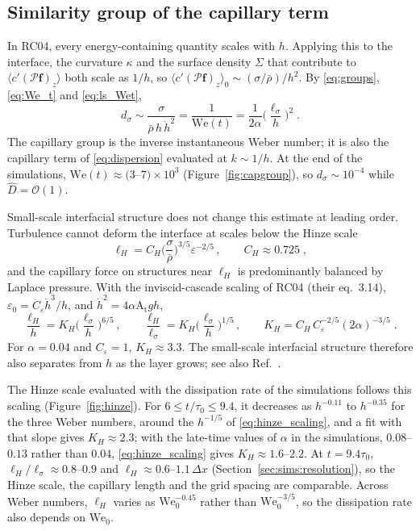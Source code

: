 \documentclass[11pt]{article}
\numberwithin{equation}{section}
\newcommand{\avg}[1]{\langle #1\rangle}
\newcommand{\At}{\mathrm{A_t}}
\newcommand{\We}{\mathrm{We}_0}
\newcommand{\ls}{\ell_\sigma}
\newcommand{\hd}{\dot h}
\begin{document}
\subsection{Similarity group of the capillary term}\label{sec:rc:capillary}
In RC04, every energy-containing quantity scales with $h$. Applying this to the interface, the curvature $\kappa$ and the surface density $\Sigma$ that contribute to $\avg{c'(\mathcal P \mathbf f)_z}$ both scale as $1/h$, so $\avg{c'(\mathcal P \mathbf f)_z}_0 \sim (\sigma/\bar\rho)/h^2$. By \eqref{eq:groups}, \eqref{eq:We_t} and \eqref{eq:ls_Wet},
\begin{equation}\label{eq:dsigma}
d_\sigma \sim \frac{\sigma}{\bar\rho \, h \, \hd^2} = \frac{1}{\mathrm{We}(t)} = \frac{1}{2 \alpha} \Big(\frac{\ls}{h}\Big)^2 \;.
\end{equation}
The capillary group is the inverse instantaneous Weber number; it is also the capillary term of \eqref{eq:dispersion} evaluated at $k \sim 1/h$. At the end of the simulations, $\mathrm{We}(t) \approx (3$--$7) \times 10^3$ (Figure~\ref{fig:capgroup}), so $d_\sigma \sim 10^{-4}$ while $\hat D = \mathcal{O}(1)$.

Small-scale interfacial structure does not change this estimate at leading order. Turbulence cannot deform the interface at scales below the Hinze scale \cite{Kolmogorov1949,Hinze1955}
\begin{equation}\label{eq:hinze}
\ell_H = C_H \Big(\frac{\sigma}{\bar\rho}\Big)^{3/5} \varepsilon^{-2/5} \, , \qquad C_H \approx 0.725 \;,
\end{equation}
and the capillary force on structures near $\ell_H$ is predominantly balanced by Laplace pressure. With the inviscid-cascade scaling of RC04 (their eq.~3.14), $\varepsilon_0 = C_\varepsilon \hd^3/h$, and $\hd^2 = 4 \alpha \At g h$,
\begin{equation}\label{eq:hinze_scaling}
\frac{\ell_H}{h} = K_H \Big(\frac{\ls}{h}\Big)^{6/5} \, , \qquad
\frac{\ell_H}{\ls} = K_H \Big(\frac{\ls}{h}\Big)^{1/5} \, , \qquad
K_H = C_H \, C_\varepsilon^{-2/5}(2 \alpha)^{-3/5} \;.
\end{equation}
For $\alpha = 0.04$ and $C_\varepsilon = 1$, $K_H \approx 3.3$. The small-scale interfacial structure therefore also separates from $h$ as the layer grows; see also Ref.~\cite{Chertkov2005}.

The Hinze scale evaluated with the dissipation rate of the simulations \cite{Walker2027_2} follows this scaling (Figure~\ref{fig:hinze}). For $6 \le t/\tau_0 \le 9.4$, it decreases as $h^{-0.11}$ to $h^{-0.35}$ for the three Weber numbers, around the $h^{-1/5}$ of \eqref{eq:hinze_scaling}, and a fit with that slope gives $K_H \approx 2.3$; with the late-time values of $\alpha$ in the simulations, $0.08$--$0.13$ rather than $0.04$, \eqref{eq:hinze_scaling} gives $K_H \approx 1.6$--$2.2$. At $t = 9.4 \tau_0$, $\ell_H/\ls \approx 0.8$--$0.9$ and $\ell_H \approx 0.6$--$1.1 \, \Delta x$ (Section~\ref{sec:sims:resolution}), so the Hinze scale, the capillary length and the grid spacing are comparable. Across Weber numbers, $\ell_H$ varies as $\We^{-0.45}$ rather than $\We^{-3/5}$, so the dissipation rate also depends on $\We$.
\end{document}
